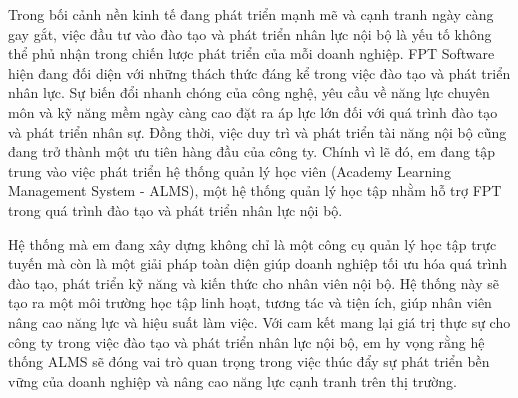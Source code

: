 \documentclass[report.tex]{subfiles}
\begin{document}
\pagestyle{fancy}


Trong bối cảnh nền kinh tế đang phát triển mạnh mẽ và cạnh tranh ngày càng gay gắt,
việc đầu tư vào đào tạo và phát triển nhân lực nội bộ là yếu tố không thể phủ nhận trong chiến lược phát triển của mỗi doanh nghiệp.
FPT Software hiện đang đối diện với những thách thức đáng kể trong việc đào tạo và phát triển nhân lực.
Sự biến đổi nhanh chóng của công nghệ, yêu cầu về năng lực chuyên môn và kỹ năng mềm ngày càng cao đặt ra áp lực lớn đối với quá trình đào tạo và phát triển nhân sự.
Đồng thời, việc duy trì và phát triển tài năng nội bộ cũng đang trở thành một ưu tiên hàng đầu của công ty.
\newline
Chính vì lẽ đó, em đang tập trung vào việc phát triển hệ thống quản lý học viên (Academy Learning Management System - ALMS),
một hệ thống quản lý học tập nhằm hỗ trợ FPT trong quá trình đào tạo và phát triển nhân lực nội bộ.
\newline

Hệ thống mà em đang xây dựng không chỉ là một công cụ quản lý học tập trực tuyến mà còn là một giải pháp toàn diện giúp doanh nghiệp tối ưu hóa quá trình đào tạo, phát triển kỹ năng và kiến thức cho nhân viên nội bộ.
Hệ thống này sẽ tạo ra một môi trường học tập linh hoạt, tương tác và tiện ích, giúp nhân viên nâng cao năng lực và hiệu suất làm việc.
\newline
Với cam kết mang lại giá trị thực sự cho công ty trong việc đào tạo và phát triển nhân lực nội bộ, em hy vọng rằng hệ thống ALMS sẽ
đóng vai trò quan trọng trong việc thúc đẩy sự phát triển bền vững của doanh nghiệp và nâng cao năng lực cạnh tranh trên thị trường.
\end{document}
